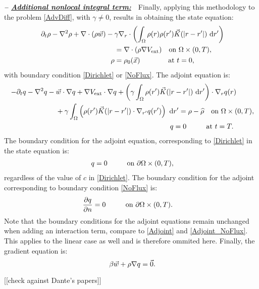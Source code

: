 \textbf{\emph{-- \underline{Additional nonlocal integral term:}}}~~Finally, applying this methodology to the problem \eqref{AdvDiff}, with $\gamma \neq 0$, results in obtaining the state equation:
\begin{align*}
\ \partial_{t}\rho-\nabla^{2}\rho+\nabla\cdot(\rho\vec{w})-{}&\gamma \nabla_{r}\cdot\left(\int_{\Omega}\rho(r)\rho(r')\vec{K}(|r-r'|)~{\rm d}r'\right) \\
\ &{}=\nabla\cdot(\rho\nabla{}V_{\text{ext}})\quad\text{on }\Omega\times(0,T), \\
\ \rho&{}=\rho_{0}(\vec{x})\hspace{4em}\text{at }t=0,
\end{align*}
with boundary condition \eqref{Dirichlet} or \eqref{NoFlux}.
The adjoint equation is:
\begin{align*}
\ -\partial_{t}\adj-\nabla^{2}\adj-{}&\vec{w}\cdot\nabla{}\adj+\nabla{}V_{\text{ext}}\cdot\nabla{}\adj+\left(\gamma\int_{\Omega}\rho(r')\vec{K}(|r-r'|)~{\rm d}r'\right)\cdot\nabla_{r}\adj(r) \\
\ &+\gamma\int_{\Omega}\left(\rho(r')\vec{K}(|r-r'|)\cdot\nabla_{r'}\adj(r')\right)~{\rm d}r'=\rho-\widehat{\rho}\quad\text{on }\Omega\times(0,T), \\
\ &\hspace{16.15em}\adj=0\quad\hspace{1.8em}\text{at }t=T. 
\end{align*}
The boundary condition for the adjoint equation, corresponding to \eqref{Dirichlet} in the state equation is:
\begin{align*}
\ q=0\quad\hspace{1.8em}\text{on }\partial\Omega\times(0,T),
\end{align*}
regardless of the value of $c$ in \eqref{Dirichlet}.
The boundary condition for the adjoint corresponding to boundary condition \eqref{NoFlux} is: 
\begin{align*}
\frac{\partial{}q}{\partial{}n}={}&0\quad\hspace{1.8em}\text{on }\partial\Omega\times(0,T).
\end{align*}
Note that the boundary conditions for the adjoint equations remain unchanged when adding an interaction term, compare to \eqref{Adjoint} and \eqref{Adjoint_NoFlux}. This applies to the linear case as well and is therefore ommited here.
Finally, the gradient equation is:
\begin{equation*}
\ \beta\vec{w}+\rho\nabla{}\adj=\vec{0}.
\end{equation*}

[[check against Dante's papers]]